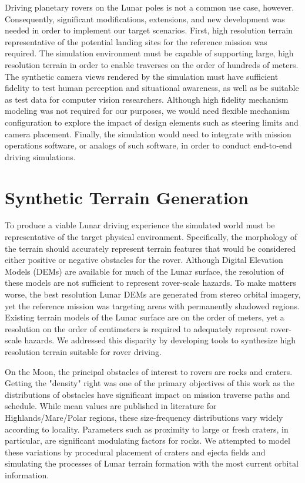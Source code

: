 \documentclass[twocolumn,letterpaper]{IEEEAerospaceCLS}  %
\begin{document}
Driving planetary rovers on the Lunar poles is not a common use case, however.  Consequently, significant modifications, extensions, and new development was needed in order to implement our target scenarios.  
First, high resolution terrain representative of the potential landing sites for the reference mission was required.  
The simulation environment must be capable of supporting large, high resolution terrain in order to enable traverses on the order of hundreds of meters.  
The synthetic camera views rendered by the simulation must have sufficient fidelity to test human perception and situational awareness, as well as be suitable as test data for computer vision researchers.  
Although high fidelity mechanism modeling was not required for our purposes, we would need flexible mechanism configuration to explore the impact of design elements such as steering limits and camera placement.  
Finally, the simulation would need to integrate with mission operations software, or analogs of such software, in order to conduct end-to-end driving simulations.  

\section{Synthetic Terrain Generation}
\label{sec:terrain-gen}

To produce a viable Lunar driving experience the simulated world must be representative of the target physical environment.  
Specifically, the morphology of the terrain should accurately represent terrain features that would be considered either positive or negative obstacles for the rover.  
Although Digital Elevation Models (DEMs) are available for much of the Lunar surface, the resolution of these models are not sufficient to represent rover-scale hazards.  
To make matters worse, the best resolution Lunar DEMs are generated from stereo orbital imagery, yet the reference mission was targeting areas with permanently shadowed regions.  
Existing terrain models of the Lunar surface are on the order of meters, yet a resolution on the order of centimeters is required to adequately represent rover-scale hazards.  
We addressed this disparity by developing tools to synthesize high resolution terrain suitable for rover driving.  

On the Moon, the principal obstacles of interest to rovers are rocks and craters.  
Getting the "density" right was one of the primary objectives of this work as the distributions of obstacles have significant impact on mission traverse paths and schedule.  
While mean values are published in literature \cite{Surveyor1968} for Highlands/Mare/Polar regions, these size-frequency distributions vary widely according to locality.  
Parameters such as proximity to large or fresh craters, in particular, are significant modulating factors for rocks.  
We attempted to model these variations by procedural placement of craters and ejecta fields and simulating the processes of Lunar terrain formation with the most current orbital information.  
\end{document}
